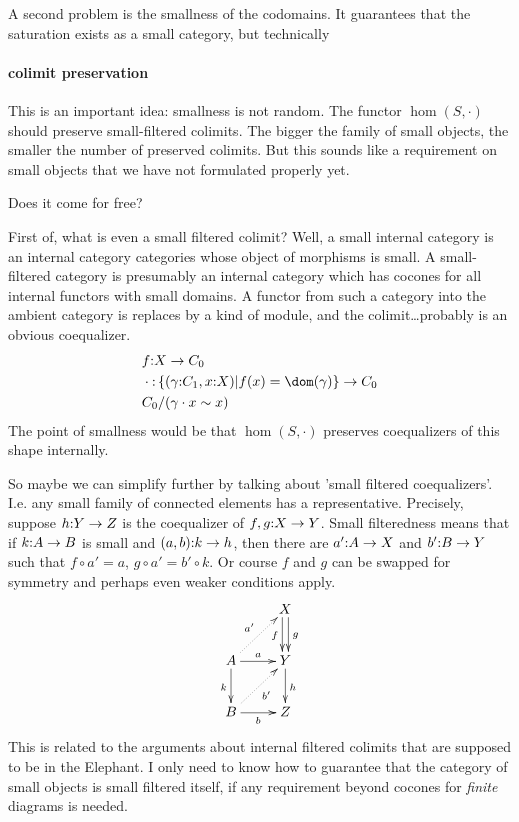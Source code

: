 \documentclass[csh.tex]{subfiles}
\begin{document}
A second problem is the smallness of the codomains. It guarantees that the saturation exists as a small category, but technically 


\paragraph{colimit preservation}
This is an important idea: smallness is not random. The functor $\hom(S,\cdot)$ should preserve small-filtered colimits. The bigger the family of small objects, the smaller the number of preserved colimits. But this sounds like a requirement on small objects that we have not formulated properly yet.

Does it come for free?


First of, what is even a small filtered colimit?
Well, a small internal category is an internal category categories whose object of morphisms is small. A small-filtered category is presumably an internal category which has cocones for all internal functors with small domains. A functor from such a category into the ambient category is replaces by a kind of module, and the colimit\dots probably is an obvious coequalizer.
\begin{align*}
&f\of X\to C_0\\
&\cdot\of \set{(\gamma\of C_1,x\of X)| f(x) = \dom(\gamma)}\to C_0\\
&C_0/(\gamma\cdot x \sim x)
\end{align*}
The point of smallness would be that $\hom(S,\cdot)$ preserves coequalizers of this shape internally.

So maybe we can simplify further by talking about 'small filtered coequalizers'. I.e. any small family of connected elements has a representative. Precisely, suppose $h\mathord : Y\to Z$ is the coequalizer of $f,g\mathord : X\to Y$. Small filteredness means that if $k\mathord : A\to B$ is small and $(a,b)\mathord : k\to h$, then there are $a'\mathord : A\to X$ and $b'\mathord : B\to Y$ such that $f\circ a' = a$, $g\circ a' = b'\circ k$. Or course $f$ and $g$ can be swapped for symmetry and perhaps even weaker conditions apply.
\[\xymatrix{
& X \ar@<-.5ex>[d]_f \ar@<.5ex>[d]^g \\
A \ar[r]^a \ar@{.>}[ur]^{a'}\ar[d]_k & Y\ar[d]^h \\
B \ar[r]_b \ar@{.>}[ur]_{b'} & Z
}\]
This is related to the arguments about internal filtered colimits that are supposed to be in the Elephant. I only need to know how to guarantee that the category of small objects is small filtered itself, if any requirement beyond cocones for \emph{finite} diagrams is needed.
\end{document}
